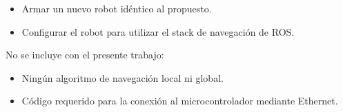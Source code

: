 \begin{itemize}
	\item Armar un nuevo robot idéntico al propuesto.
	\item Configurar el robot para utilizar el stack de navegación de ROS.
\end{itemize} 

No se incluye con el presente trabajo:
\begin{itemize}
	\item Ningún algoritmo de navegación local ni global.
	\item Código requerido para la conexión al microcontrolador mediante Ethernet.
\end{itemize}